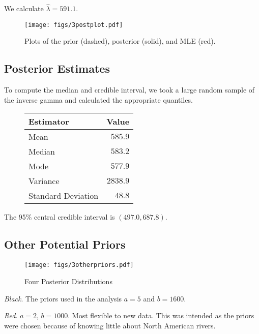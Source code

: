 \documentclass[12pt]{article}
\begin{document}
\noindent We calculate $\hat{\lambda}=591.1$.

\begin{figure}[H]
\begin{center}
\texttt{[image: figs/3postplot.pdf]}
\caption{Plots of the prior (dashed), posterior (solid), and MLE (red).}
\end{center}
\end{figure}

\subsection{Posterior Estimates}

\noindent To compute the median and credible interval, we took a large random sample of the inverse gamma and calculated the appropriate quantiles.

\begin{figure}[H]
\begin{center}
\begin{tabular}{l|r}
Estimator & \multicolumn{1}{l}{Value} \\ \hline \hline
Mean               & $585.9$ \\
Median             & $583.2$ \\
Mode               & $577.9$ \\
Variance           & $2838.9$ \\
Standard Deviation & $48.8$ \\
\end{tabular}
\end{center}
\end{figure}

\noindent The 95\% central credible interval is $(497.0, 687.8)$.

\subsection{Other Potential Priors}

\begin{figure}[H]
\begin{center}
\texttt{[image: figs/3otherpriors.pdf]}
\caption{Four Posterior Distributions}
\end{center}
\end{figure}

\noindent \emph{Black}.  The priors used in the analysis $a=5$ and $b=1600$.

\noindent \emph{Red}. $a=2$, $b=1000$.  Most flexible to new data.  This was intended as the priors were chosen because of knowing little about North American rivers.
\end{document}
